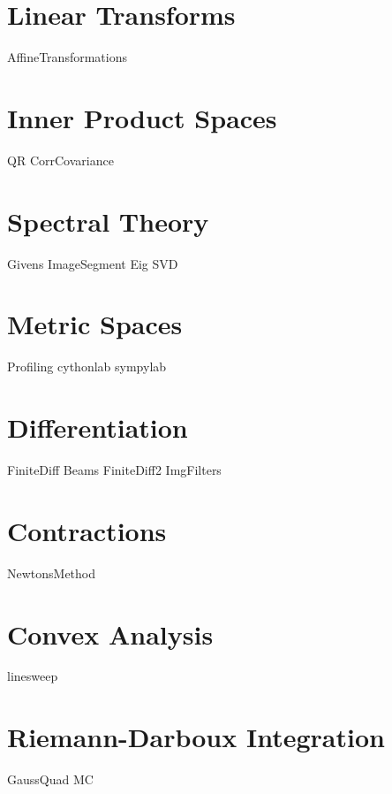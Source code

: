 \documentclass[nociteref]{SIAM-GH-book}
\begin{document}
\part{Linear Transforms}
{AffineTransformations}

\part{Inner Product Spaces}
{QR}
{CorrCovariance}

\part{Spectral Theory}
{Givens}
{ImageSegment}
{Eig}
{SVD}

\part{Metric Spaces}
{Profiling}
{cythonlab}
{sympylab}

\part{Differentiation}
{FiniteDiff}
{Beams}
{FiniteDiff2}
{ImgFilters}

\part{Contractions}
{NewtonsMethod}

\part{Convex Analysis}
{linesweep}

\part{Riemann-Darboux Integration}
{GaussQuad}
{MC}
\end{document}
